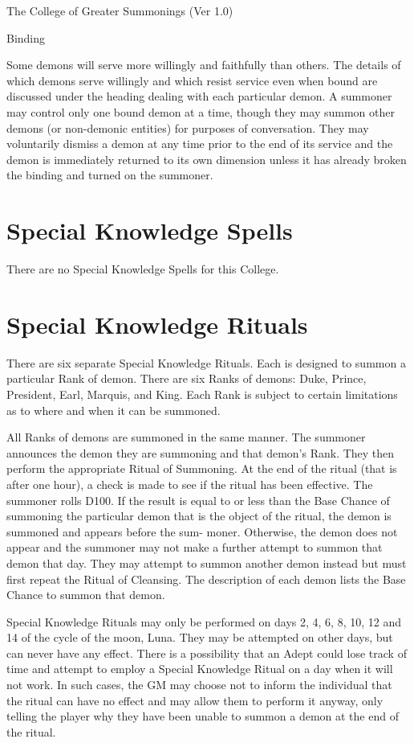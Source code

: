 \begin{Chapter}{The College of Greater Summonings (Ver 1.0)}
\begin{ritual}[Q-6]{Binding}
\begin{effects}
Some demons will serve more willingly and faithfully than others.  The
details of which demons serve willingly and which resist service even
when bound are discussed under the heading dealing with each
particular demon.  A summoner may control only one bound demon at a
time, though they may summon other demons (or non-demonic entities)
for purposes of conversation.  They may voluntarily dismiss a demon at
any time prior to the end of its service and the demon is immediately
returned to its own dimension unless it has already broken the binding
and turned on the summoner.

\end{effects}
\end{ritual}

\section{Special Knowledge Spells}

There are no Special Knowledge Spells for this College.


\section{Special Knowledge Rituals}

There are six separate Special Knowledge Rituals.  Each is designed to
summon a particular Rank of demon.  There are six Ranks of demons:
Duke, Prince, President, Earl, Marquis, and King.  Each Rank is
subject to certain limitations as to where and when it can be
summoned.

All Ranks of demons are summoned in the same manner. The summoner
announces the demon they are summoning and that demon’s Rank. They
then perform the appropriate Ritual of Summoning.  At the end of the
ritual (that is after one hour), a check is made to see if the ritual
has been effective. The summoner rolls D100.  If the result is equal
to or less than the Base Chance of summoning the particular demon that
is the object of the ritual, the demon is summoned and appears before
the sum- moner. Otherwise, the demon does not appear and the summoner
may not make a further attempt to summon that demon that day. They may
attempt to summon another demon instead but must first repeat the
Ritual of Cleansing.  The description of each demon lists the Base
Chance to summon that demon.

Special Knowledge Rituals may only be performed on days 2, 4, 6, 8,
10, 12 and 14 of the cycle of the moon, Luna. They may be attempted on
other days, but can never have any effect. There is a possibility that
an Adept could lose track of time and attempt to employ a Special
Knowledge Ritual on a day when it will not work.  In such cases, the
GM may choose not to inform the individual that the ritual can have no
effect and may allow them to perform it anyway, only telling the
player why they have been unable to summon a demon at the end of the
ritual.


\end{Chapter}
